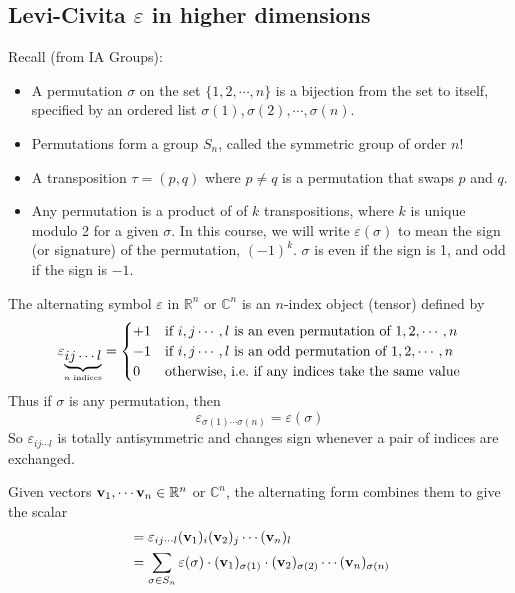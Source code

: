 \subsection{Levi-Civita \texorpdfstring{\( \varepsilon \)}{𝜀} in higher dimensions}
Recall (from IA Groups):
\begin{itemize}
	\item A permutation \(\sigma\) on the set \(\{ 1, 2, \cdots, n \}\) is a bijection from the set to itself, specified by an ordered list \(\sigma(1), \sigma(2), \cdots, \sigma(n)\).
	\item Permutations form a group \(S_n\), called the symmetric group of order \(n!
	      \)
	\item A transposition \(\tau = (p, q)\) where \(p \neq q\) is a permutation that swaps \(p\) and \(q\).
	\item Any permutation is a product of of \(k\) transpositions, where \(k\) is unique modulo 2 for a given \(\sigma\).
	      In this course, we will write \(\varepsilon(\sigma)\) to mean the sign (or signature) of the permutation, \((-1)^k\).
	      \(\sigma\) is even if the sign is 1, and odd if the sign is \(-1\).
\end{itemize}
The alternating symbol \(\varepsilon\) in \(\mathbb R^n\) or \(\mathbb C^n\) is an \(n\)-index object (tensor) defined by
\[
	\varepsilon_{\underbrace{ij\cdots l}_{\mathclap{n \text{ indices}}}} = \begin{cases}
		+1 & \text{if } i, j \cdots, l \text{ is an even permutation of } 1, 2, \cdots, n \\
		-1 & \text{if } i, j \cdots, l \text{ is an odd permutation of } 1, 2, \cdots, n  \\
		0  & \text{otherwise, i.e.\ if any indices take the same value}
	\end{cases}
\]
Thus if \(\sigma\) is any permutation, then
\[
	\varepsilon_{\sigma(1)\cdots\sigma(n)} = \varepsilon(\sigma)
\]
So \(\varepsilon_{ij\cdots l}\) is totally antisymmetric and changes sign whenever a pair of indices are exchanged.
\begin{definition}
	Given vectors \(\vb v_1, \cdots \vb v_n \in \mathbb R^n\) or \(\mathbb C^n\), the alternating form combines them to give the scalar
	\begin{align*}
		[\vb v_1, \vb v_2, \cdots, \vb v_n ] & = \varepsilon_{ij\cdots l} (\vb v_1)_i (\vb v_2)_j \cdots (\vb v_n)_l                                                            \\
		                                     & = \sum_{\sigma \in S_n} \varepsilon(\sigma) \cdot (\vb v_1)_{\sigma(1)} \cdot (\vb v_2)_{\sigma(2)} \cdots (\vb v_n)_{\sigma(n)}
	\end{align*}
\end{definition}

